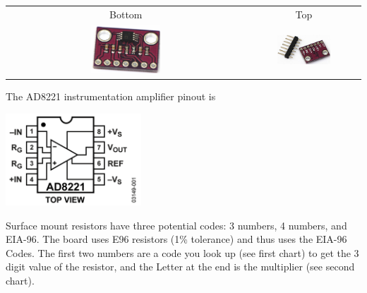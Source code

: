 \noindent
\begin{tabular}{cc}
Bottom & Top \\
\includegraphics[width=0.3\textwidth]{../images/InstAmpBreakoutBottom.jpg} &
\includegraphics[width=0.5\textwidth]{../images/InstAmpBreakoutTop.jpg}\\
\end{tabular}

The AD8221 instrumentation amplifier pinout is

\includegraphics[width=0.38\textwidth]{../images/AD8221-FBL.png}

Surface mount resistors have three potential codes: 3 numbers, 4 numbers, and EIA-96.  The board uses E96 resistors (1\% tolerance) and thus uses the EIA-96 Codes.  The first two numbers are a code you look up (see first chart) to get the 3 digit value of the resistor, and the Letter at the end is the multiplier (see second chart).

